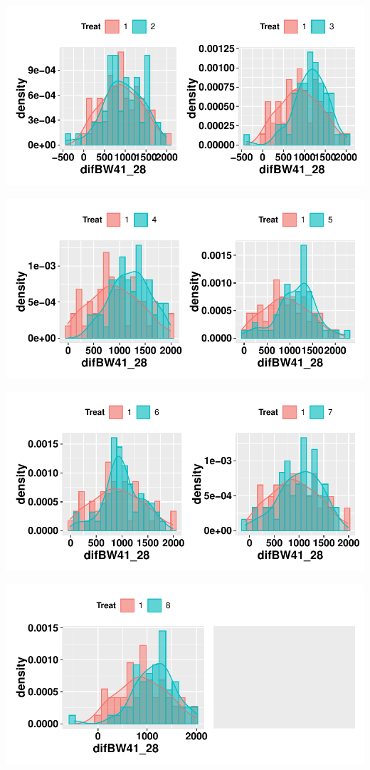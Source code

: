 \documentclass[11pt,a4paper]{article}\usepackage[]{graphicx}\usepackage[]{color}
\makeatletter
\def\maxwidth{ %
  \ifdim\Gin@nat@width>\linewidth
    \linewidth
  \else
    \Gin@nat@width
  \fi
}
\newenvironment{knitrout}{}{} %
\makeatother
\begin{document}
\begin{knitrout}
\color{fgcolor}
\includegraphics[width=\maxwidth]{figure/unnamed-chunk-11-1} 

\includegraphics[width=\maxwidth]{figure/unnamed-chunk-11-2} 

\includegraphics[width=\maxwidth]{figure/unnamed-chunk-11-3} 

\includegraphics[width=\maxwidth]{figure/unnamed-chunk-11-4} 

\end{knitrout}
\end{document}
